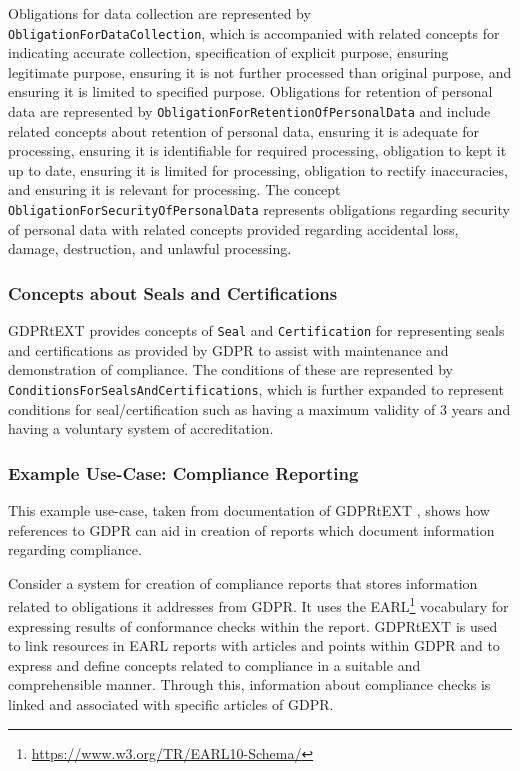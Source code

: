 Obligations for data collection are represented by \texttt{ObligationForDataCollection}, which is accompanied with related concepts for indicating accurate collection, specification of explicit purpose, ensuring legitimate purpose, ensuring it is not further processed than original purpose, and ensuring it is limited to specified purpose.
Obligations for retention of personal data are represented by \texttt{ObligationForRetentionOfPersonalData} and include related concepts about    retention of personal data, ensuring it is adequate for processing, ensuring it is identifiable for required processing, obligation to kept it up to date, ensuring it is limited for processing, obligation to rectify inaccuracies, and ensuring it is relevant for processing. 
The concept \texttt{ObligationForSecurityOfPersonalData} represents obligations regarding security of personal data with related concepts provided regarding accidental loss, damage, destruction, and unlawful processing.

\subsubsection{Concepts about Seals and Certifications}
GDPRtEXT provides concepts of \texttt{Seal} and \texttt{Certification} for representing seals and certifications as provided by GDPR to assist with maintenance and demonstration of compliance.
The conditions of these are represented by \texttt{ConditionsForSealsAndCertifications}, which is further expanded to represent conditions for seal/certification such as having a maximum validity of 3 years and having a voluntary system of accreditation. 

\subsubsection{Example Use-Case: Compliance Reporting}
This example use-case, taken from documentation of GDPRtEXT \cite{pandit_gdprtext_2018}, shows how references to GDPR can aid in creation of reports which document information regarding compliance. 

Consider a system for creation of compliance reports that stores information related to obligations it addresses from GDPR. It uses the EARL\footnote{\url{https://www.w3.org/TR/EARL10-Schema/}} vocabulary for expressing results of conformance checks within the report. GDPRtEXT is used to link resources in EARL reports with articles and points within GDPR and to express and define concepts related to compliance in a suitable and comprehensible manner. Through this, information about compliance checks is linked and associated with specific articles of GDPR.

